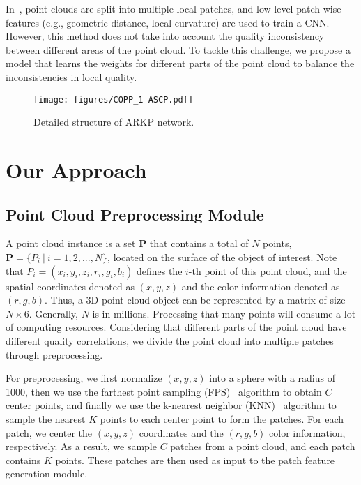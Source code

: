 \documentclass[conference]{IEEEtran}
\begin{document}
In~\cite{chetouani2021deep}, point clouds are split into multiple local patches, and low level patch-wise features (e.g., geometric distance, local curvature) are used to train a CNN. However, this method does not take into account the quality inconsistency between different areas of the point cloud. To tackle this challenge, we propose a model that learns the weights for different parts of the point cloud to balance the inconsistencies in local quality.


\begin{figure}[t]       \begin{center}
    \texttt{[image: figures/COPP\_1-ASCP.pdf]}
\end{center}
\vspace{-0.1cm}
   \caption{Detailed structure of ARKP network.}
\label{fig:ARKP}
\end{figure}






\section{Our Approach}





\subsection{Point Cloud Preprocessing Module}
A point cloud instance is a set $\mathbf{P}$ that contains a total of $N$ points, $\mathbf{P} = \{P_{i}\ |\ i=1,2,...,N\}$, located on the surface of the object of interest. Note that $P_{i}=(x_{i}, y_{i}, z_{i}, r_{i}, g_{i}, b_{i})$ defines the $i$-th point of this point cloud, and the spatial coordinates denoted as $(x,y,z)$ and the color information denoted as $(r,g,b)$. Thus, a 3D point cloud object can be represented by a matrix of size $N \times 6$. Generally, $N$ is in millions. Processing that many points will consume a lot of computing resources. Considering that different parts of the point cloud have different quality correlations, we divide the point cloud into multiple patches through preprocessing.

For preprocessing, we first normalize $(x,y,z)$ into a sphere with a radius of 1000, then we use the farthest point sampling (FPS)~\cite{qi2017pointnet++} algorithm to obtain $C$ center points, and finally we use the k-nearest neighbor (KNN)~\cite{abeywickrama2016k} algorithm to sample the nearest $K$ points to each center point to form the patches. For each patch, we center the $(x,y,z)$ coordinates and the $(r,g,b)$ color information, respectively. As a result, we sample $C$ patches from a point cloud, and each patch contains $K$ points. These patches are then used as input to the patch feature generation module.
\end{document}
